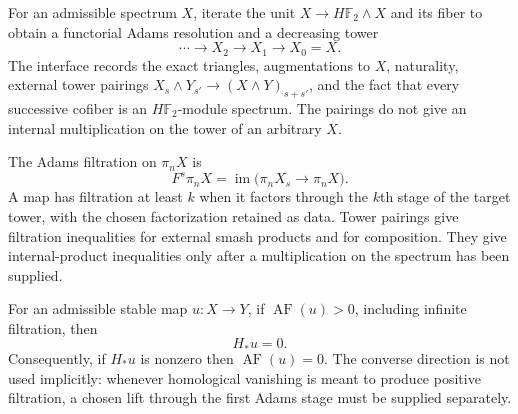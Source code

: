 \begin{definition}
  \label{def:hf2-adams-tower}
  \notready
  For an admissible spectrum $X$, iterate the unit
  $X\to H\mathbb F_2\wedge X$ and its fiber to obtain a functorial Adams
  resolution and a decreasing tower
  \[
    \cdots\longrightarrow X_2\longrightarrow X_1\longrightarrow X_0=X.
  \]
  The interface records the exact triangles, augmentations to $X$, naturality,
  external tower pairings
  $X_s\wedge Y_{s'}\to (X\wedge Y)_{s+s'}$, and the fact that every successive
  cofiber is an $H\mathbb F_2$-module spectrum.  The pairings do not give an
  internal multiplication on the tower of an arbitrary $X$.
\end{definition}

\begin{definition}
  \label{def:adams-tower-filtration}
  \notready
  The Adams filtration on $\pi_nX$ is
  \[
    F^s\pi_nX=\operatorname{im}\bigl(\pi_nX_s\longrightarrow\pi_nX\bigr).
  \]
  A map has filtration at least $k$ when it factors through the $k$th stage of
  the target tower, with the chosen factorization retained as data.  Tower
  pairings give filtration inequalities for external smash products and for
  composition.  They give internal-product inequalities only after a
  multiplication on the spectrum has been supplied.
\end{definition}

\begin{proposition}
  \label{prop:positive-adams-filtration-homology-zero}
  \notready
  For an admissible stable map $u:X\to Y$, if
  $\operatorname{AF}(u)>0$, including infinite filtration, then
  \[
    H_*u=0.
  \]
  Consequently, if $H_*u$ is nonzero then $\operatorname{AF}(u)=0$.  The
  converse direction is not used implicitly: whenever homological vanishing
  is meant to produce positive filtration, a chosen lift through the first
  Adams stage must be supplied separately.
\end{proposition}

